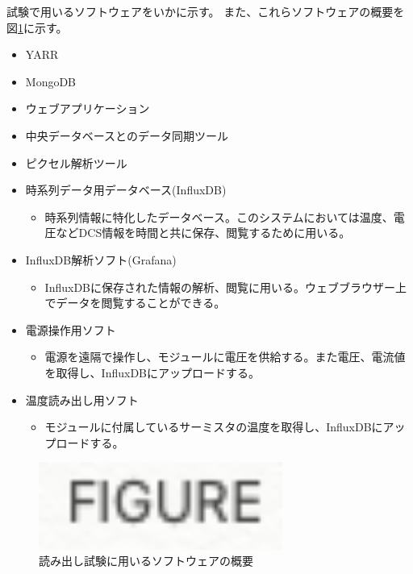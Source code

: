 試験で用いるソフトウェアをいかに示す。
また、これらソフトウェアの概要を図\ref{readout_SW_overview}に示す。
\begin{itemize}
  \item YARR
  \item MongoDB
  \item ウェブアプリケーション
  \item 中央データベースとのデータ同期ツール
  \item ピクセル解析ツール
  \item 時系列データ用データベース(InfluxDB)
    \begin{itemize}
      \item 時系列情報に特化したデータベース。このシステムにおいては温度、電圧などDCS情報を時間と共に保存、閲覧するために用いる。
    \end{itemize}
  \item InfluxDB解析ソフト(Grafana)
    \begin{itemize}
      \item InfluxDBに保存された情報の解析、閲覧に用いる。ウェブブラウザー上でデータを閲覧することができる。
    \end{itemize}
  \item 電源操作用ソフト
    \begin{itemize}
      \item 電源を遠隔で操作し、モジュールに電圧を供給する。また電圧、電流値を取得し、InfluxDBにアップロードする。
    \end{itemize}
  \item 温度読み出し用ソフト
    \begin{itemize}
      \item モジュールに付属しているサーミスタの温度を取得し、InfluxDBにアップロードする。
    \end{itemize}
\end{itemize}

\begin{figure}[bpt]\centering
\includegraphics[width=8cm]{figure}
\caption[読み出し試験に用いるソフトウェアの概要]{読み出し試験に用いるソフトウェアの概要}
\label{readout_SW_overview}
\end{figure}

